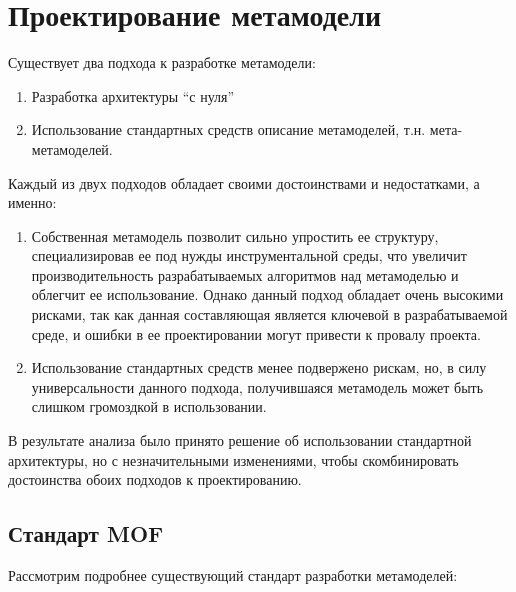 \section{Проектирование метамодели}
\label{sec:metamodel_architecture}
Существует два подхода к разработке метамодели:

\begin{enumerate}
    \item Разработка архитектуры ``с нуля''
    \item Использование стандартных средств описание метамоделей, т.н.
    мета-метамоделей.
\end{enumerate}

Каждый из двух подходов обладает своими достоинствами и недостатками, а именно:

\begin{enumerate}
    \item Собственная метамодель позволит сильно упростить ее структуру,
    специализировав ее под нужды инструментальной среды, что увеличит
    производительность разрабатываемых алгоритмов над метамоделью и облегчит ее
    использование. Однако данный подход обладает очень высокими рисками, так как
    данная составляющая является ключевой в разрабатываемой среде, и ошибки в ее
    проектировании могут привести к провалу проекта.
    \item Использование стандартных средств менее подвержено рискам, но, в силу
    универсальности данного подхода, получившаяся метамодель может быть слишком
    громоздкой в использовании.
\end{enumerate}

В результате анализа было принято решение об использовании стандартной
архитектуры, но с незначительными изменениями, чтобы скомбинировать достоинства
обоих подходов к проектированию.

\subsection{Стандарт MOF}

Рассмотрим подробнее существующий стандарт разработки метамоделей:


